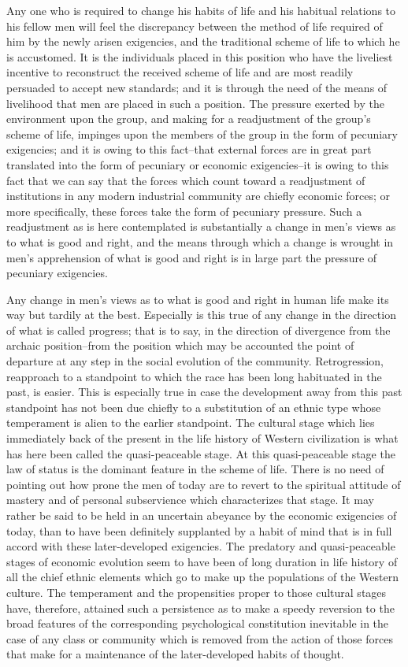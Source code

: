 \documentclass[12pt]{report}
\begin{document}
Any one who is required to change his habits of life and his habitual
relations to his fellow men will feel the discrepancy between the
method of life required of him by the newly arisen exigencies, and
the traditional scheme of life to which he is accustomed. It is the
individuals placed in this position who have the liveliest incentive to
reconstruct the received scheme of life and are most readily persuaded
to accept new standards; and it is through the need of the means of
livelihood that men are placed in such a position. The pressure exerted
by the environment upon the group, and making for a readjustment of the
group's scheme of life, impinges upon the members of the group in
the form of pecuniary exigencies; and it is owing to this fact--that
external forces are in great part translated into the form of pecuniary
or economic exigencies--it is owing to this fact that we can say that
the forces which count toward a readjustment of institutions in any
modern industrial community are chiefly economic forces; or more
specifically, these forces take the form of pecuniary pressure. Such a
readjustment as is here contemplated is substantially a change in men's
views as to what is good and right, and the means through which a change
is wrought in men's apprehension of what is good and right is in large
part the pressure of pecuniary exigencies.

Any change in men's views as to what is good and right in human life
make its way but tardily at the best. Especially is this true of any
change in the direction of what is called progress; that is to say, in
the direction of divergence from the archaic position--from the position
which may be accounted the point of departure at any step in the social
evolution of the community. Retrogression, reapproach to a standpoint to
which the race has been long habituated in the past, is easier. This is
especially true in case the development away from this past standpoint
has not been due chiefly to a substitution of an ethnic type whose
temperament is alien to the earlier standpoint. The cultural stage which
lies immediately back of the present in the life history of Western
civilization is what has here been called the quasi-peaceable stage. At
this quasi-peaceable stage the law of status is the dominant feature in
the scheme of life. There is no need of pointing out how prone the
men of today are to revert to the spiritual attitude of mastery and of
personal subservience which characterizes that stage. It may rather be
said to be held in an uncertain abeyance by the economic exigencies of
today, than to have been definitely supplanted by a habit of mind that
is in full accord with these later-developed exigencies. The predatory
and quasi-peaceable stages of economic evolution seem to have been of
long duration in life history of all the chief ethnic elements which go
to make up the populations of the Western culture. The temperament
and the propensities proper to those cultural stages have, therefore,
attained such a persistence as to make a speedy reversion to the broad
features of the corresponding psychological constitution inevitable in
the case of any class or community which is removed from the action of
those forces that make for a maintenance of the later-developed habits
of thought.
\end{document}
